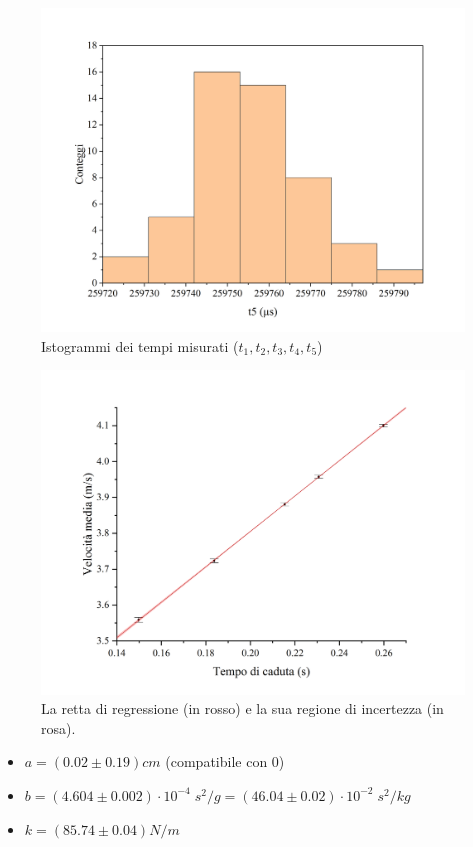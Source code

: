 \documentclass{article}
\begin{document}
\begin{figure}[H]
\end{figure}\begin{figure}[H]
    \vspace{-.6cm}
    \centering
    \includegraphics[trim={2cm .5cm 2.4cm 2.1cm},clip,width=.5\textwidth]{t5.jpg}
    \caption{Istogrammi dei tempi misurati ($t_1,t_2,t_3,t_4,t_5$)}
\end{figure}

\begin{figure}[H]
    \includegraphics[trim={0 1.8cm 0 0},width=\textwidth]{Regressione.jpg}
    \caption{
        La retta di regressione (in rosso)
        e la sua regione di incertezza (in rosa).
    }
\end{figure}

\begin{itemize}
    \item $a = \left(0.02\pm0.19\right)\unit{cm}$ (compatibile con 0)
    \item $
        b = \left(4.604\pm0.002\right)\cdot10^{-4}\;\unit{s^2\per g}
          = \left(46.04\pm0.02\right)\cdot10^{-2}\;\unit{s^2\per kg}
    $
    \item $k = \left(85.74\pm0.04\right)\unit{N\per m}$
\end{itemize}
\end{document}
